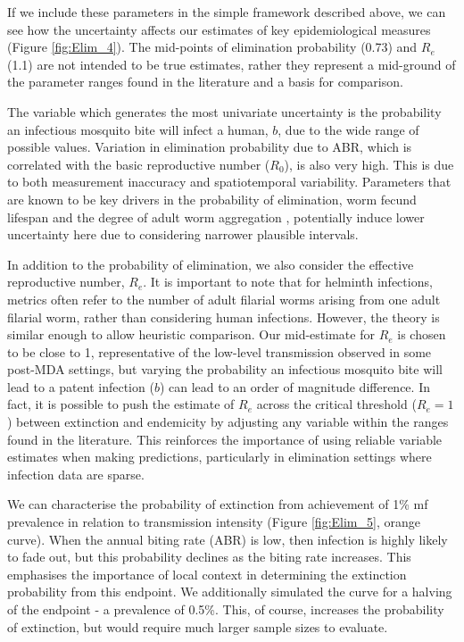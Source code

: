 If we include these parameters in the simple framework described above, we can see how the uncertainty affects our estimates of key epidemiological measures (Figure \ref{fig:Elim_4}). The mid-points of elimination probability (0.73) and $R_e$ (1.1) are not intended to be true estimates, rather they represent a mid-ground of the parameter ranges found in the literature and a basis for comparison. 

The variable which generates the most univariate uncertainty is the probability an infectious mosquito bite will infect a human, $b$, due to the wide range of possible values. Variation in elimination probability due to ABR, which is correlated with the basic reproductive number ($R_0$), is also very high. This is due to both measurement inaccuracy and spatiotemporal variability. Parameters that are known to be key drivers in the probability of elimination, worm fecund lifespan and the degree of adult worm aggregation \cite{irvine2015,Truscott2017,Anderson2014}, potentially induce lower uncertainty here due to considering narrower plausible intervals.

In addition to the probability of elimination, we also consider the effective reproductive number, $R_e$. It is important to note that for helminth infections, metrics often refer to the number of adult filarial worms arising from one adult filarial worm, rather than considering human infections. However, the theory is similar enough to allow heuristic comparison. Our mid-estimate for $R_e$ is chosen to be close to 1, representative of the low-level transmission observed in some post-MDA settings, but varying the probability an infectious mosquito bite will lead to a patent infection ($b$) can lead to an order of magnitude difference. In fact, it is possible to push the estimate of $R_e$ across the critical threshold ($R_e=1$) between extinction and endemicity by adjusting any variable within the ranges found in the literature. This reinforces the importance of using reliable variable estimates when making predictions, particularly in elimination settings where infection data are sparse. 

We can characterise the probability of extinction from achievement of 1\% mf prevalence in relation to transmission intensity (Figure \ref{fig:Elim_5}, orange curve). When the annual biting rate (ABR) is low, then infection is highly likely to fade out, but this probability declines as the biting rate increases. This emphasises the importance of local context in determining the extinction probability from this endpoint. We additionally simulated the curve for a halving of the endpoint - a prevalence of 0.5\%. This, of course, increases the probability of extinction, but would require much larger sample sizes to evaluate. 

